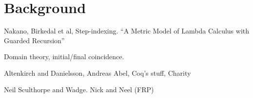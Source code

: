 \section{Background}\label{sec:background}

Nakano, Birkedal et al, Step-indexing. ``A Metric Model of Lambda
Calculus with Guarded Recursion''

Domain theory, initial/final coincidence.

Altenkirch and Danielsson, Andreas Abel, Coq's stuff, Charity

Neil Sculthorpe and Wadge. Nick and Neel (FRP)

